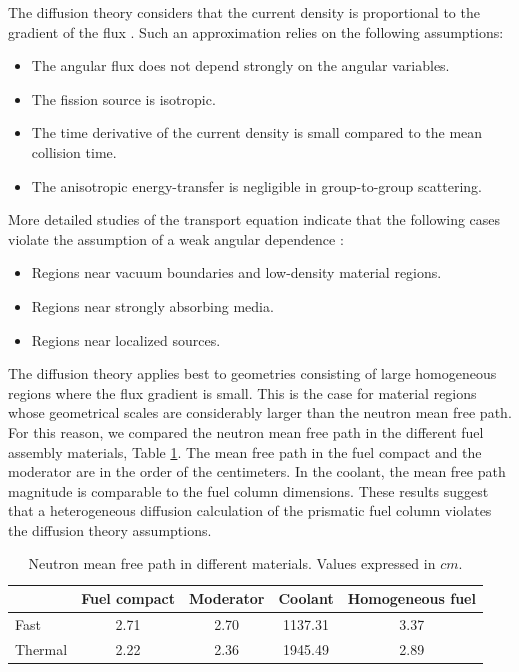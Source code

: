 The diffusion theory considers that the current density is proportional to the gradient of the flux \cite{leppanen_development_2007}.
Such an approximation relies on the following assumptions:
\begin{itemize}
	\item The angular flux does not depend strongly on the angular variables.
	\item The fission source is isotropic.
	\item The time derivative of the current density is small compared to the mean collision time.
	\item The anisotropic energy-transfer is negligible in group-to-group scattering.
\end{itemize}

More detailed studies of the transport equation indicate that the following cases violate the assumption of a weak angular dependence \cite{duderstadt_nuclear_1976}:
\begin{itemize}
    \item Regions near vacuum boundaries and low-density material regions.
    \item Regions near strongly absorbing media.
    \item Regions near localized sources.
\end{itemize}

The diffusion theory applies best to geometries consisting of large homogeneous regions where the flux gradient is small.
This is the case for material regions whose geometrical scales are considerably larger than the neutron mean free path.
For this reason, we compared the neutron mean free path in the different fuel assembly materials, Table \ref{tab:mfp}.
The mean free path in the fuel compact and the moderator are in the order of the centimeters.
In the coolant, the mean free path magnitude is comparable to the fuel column dimensions.
These results suggest that a heterogeneous diffusion calculation of the prismatic fuel column violates the diffusion theory assumptions.

\begin{table}[htbp!]
  \centering
  \caption{Neutron mean free path in different materials. Values expressed in $cm$.}
  \begin{tabular}{l|cccc}
  \toprule
              & Fuel compact  & Moderator  & Coolant  & Homogeneous fuel \\
  \midrule
  Fast  		& 2.71 & 2.70 & 1137.31 & 3.37 \\
  Thermal		& 2.22 & 2.36 & 1945.49 & 2.89 \\

  \bottomrule
  \end{tabular}
  \label{tab:mfp}
\end{table}

